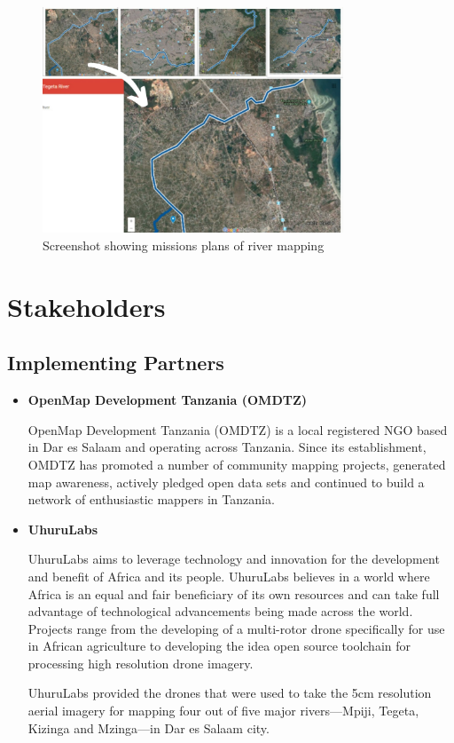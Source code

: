 \documentclass[a4paper,12pt,twoside]{article}
\begin{document}
        \begin{figure}%
            \centering
            \includegraphics[width=0.8\textwidth]{images/image14.jpg}
            \caption{Screenshot showing missions plans of river mapping}
        \end{figure}

\section{Stakeholders}

\subsection{Implementing Partners}

    \begin{itemize}
        \item \textbf{OpenMap Development Tanzania (OMDTZ)} %
    
        OpenMap Development Tanzania (OMDTZ) is a local registered NGO based in Dar es Salaam and operating across Tanzania. Since its establishment, OMDTZ has promoted a number of community mapping projects, generated map awareness, actively pledged open data sets and continued to build a network of enthusiastic mappers in Tanzania.
    
        \item \textbf{UhuruLabs}
    
        UhuruLabs aims to leverage technology and innovation for the development and benefit of Africa and its people. UhuruLabs believes in a world where Africa is an equal and fair beneficiary of its own resources and can take full advantage of technological advancements being made across the world. Projects range from the developing of a multi-rotor drone specifically for use in African agriculture to developing the idea open source toolchain for processing high resolution drone imagery. 
    
        UhuruLabs provided the drones that were used to take the 5cm resolution aerial imagery for mapping four out of five major rivers---Mpiji, Tegeta, Kizinga and Mzinga---in Dar es Salaam city. %
    
    \end{itemize}
\end{document}
